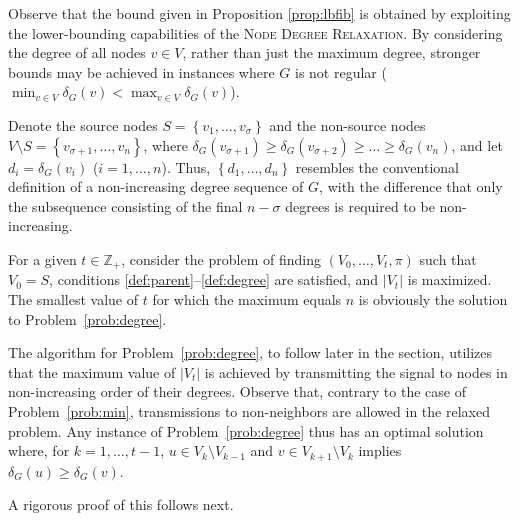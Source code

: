 Observe that the bound given in Proposition \ref{prop:lbfib} is obtained by exploiting the lower-bounding capabilities of the \textsc{Node Degree Relaxation}.
By considering the degree of all nodes $v\in V$, rather than just the maximum degree, stronger bounds may be achieved in instances where $G$ is not regular
($\min_{v\in V}\delta_G(v)<\max_{v\in V}\delta_G(v)$).

Denote the source nodes $S=\left\{v_1,\dots,v_{\sigma}\right\}$ and the non-source nodes $V\setminus S=\left\{v_{\sigma+1},\ldots,v_n\right\}$, where $\delta_G(v_{\sigma+1})\geq\delta_G(v_{\sigma+2})\geq\dots\geq\delta_G(v_n)$,
and let $d_i=\delta_G(v_i)$ ($i=1,\ldots,n$).
Thus, $\left\{d_1,\ldots,d_n\right\}$ resembles the conventional definition of a non-increasing degree sequence of $G$,
with the difference that only the subsequence consisting of the final $n-\sigma$ degrees is required to be non-increasing.

For a given $t\in\mathbb{Z}_+$, consider the problem of finding $\left(V_0,\ldots,V_t,\pi\right)$ such that $V_0=S$,
conditions \ref{def:parent}--\ref{def:degree} are satisfied, and $\left|V_t\right|$ is maximized.
The smallest value of $t$ for which the maximum equals $n$ is obviously the solution to Problem~\ref{prob:degree}.

The algorithm for Problem~\ref{prob:degree}, to follow later in the section, utilizes that the maximum value of $\left|V_t\right|$
is achieved by transmitting the signal to nodes in non-increasing order of their degrees.
Observe that, contrary to the case of Problem~\ref{prob:min}, transmissions to non-neighbors are allowed in the relaxed problem.
Any instance of Problem~\ref{prob:degree} thus has an optimal solution where, for $k=1,\ldots,t-1$,
$u\in V_k\setminus V_{k-1}$ and $v\in V_{k+1}\setminus V_k$ implies $\delta_G(u)\geq\delta_G(v)$.

A rigorous proof of this follows next.

